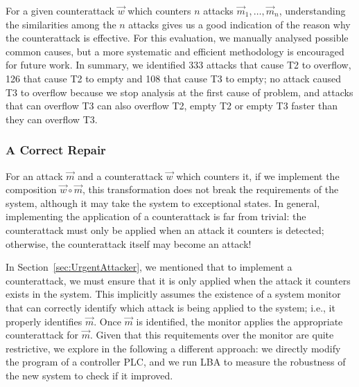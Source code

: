 {{For a given counterattack $\vec{w}$ which counters $n$ attacks $\vec{m}_1, \ldots, \vec{m}_n$, understanding the similarities among the $n$ attacks gives us a good indication of the reason why the counterattack is effective. For this evaluation, we manually analysed possible common causes, but a more systematic and efficient methodology is encouraged for future work. In summary, we identified 333 attacks that cause T2 to overflow, 126 that cause T2 to empty and 108 that cause T3 to empty; no attack caused T3 to overflow because we stop analysis at the first cause of problem, and attacks that can overflow T3 can also overflow T2, empty T2 or empty T3 faster than they can overflow T3.


\subsubsection{A Correct Repair}
\label{sec:CorrectRepair}
For an attack $\vec{m}$ and a counterattack $\vec{w}$ which counters it, if we implement the composition $\vec{w}\circ \vec{m}$, this transformation does not break the requirements of the system, although it may take the system to exceptional states. In general, implementing the application of a counterattack is far from trivial: the counterattack must only be applied when an attack it counters is detected; otherwise, the counterattack itself may become an attack! 

In Section~\ref{sec:UrgentAttacker}, we mentioned that to implement a counterattack, we must ensure that it is only applied when the attack it counters exists in the system. This implicitly assumes the existence of a system monitor that can correctly identify which attack is being applied to the system; i.e., it properly identifies $\vec{m}$. Once $\vec{m}$ is identified, the monitor applies the appropriate counterattack for $\vec{m}$. Given that this requitements over the monitor are quite restrictive, we explore in the following a different approach: we directly modify the program of a controller PLC, and we run LBA to measure the robustness of the new system to check if it improved. 

}}
